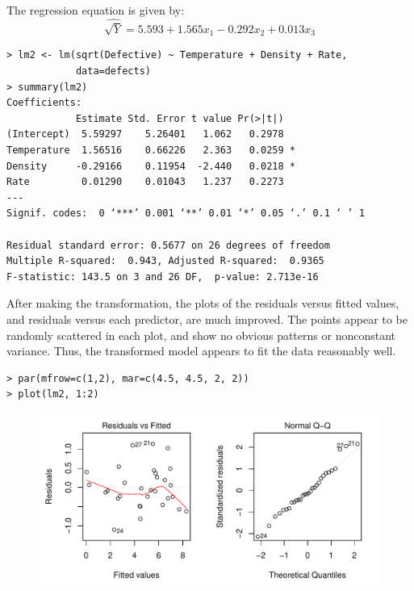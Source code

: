 \documentclass[10pt]{beamer}\usepackage[]{graphicx}\usepackage[]{color}
\begin{document}
\begin{frame}[fragile]
The regression equation is given by:
$$\widehat{\sqrt{Y}} = 5.593 + 1.565 x_1 - 0.292 x_2 + 0.013 x_3$$
\small
\begin{verbatim}
> lm2 <- lm(sqrt(Defective) ~ Temperature + Density + Rate, 
            data=defects)
> summary(lm2)
Coefficients:
            Estimate Std. Error t value Pr(>|t|)  
(Intercept)  5.59297    5.26401   1.062   0.2978  
Temperature  1.56516    0.66226   2.363   0.0259 *
Density     -0.29166    0.11954  -2.440   0.0218 *
Rate         0.01290    0.01043   1.237   0.2273  
---
Signif. codes:  0 ‘***’ 0.001 ‘**’ 0.01 ‘*’ 0.05 ‘.’ 0.1 ‘ ’ 1

Residual standard error: 0.5677 on 26 degrees of freedom
Multiple R-squared:  0.943,	Adjusted R-squared:  0.9365 
F-statistic: 143.5 on 3 and 26 DF,  p-value: 2.713e-16
\end{verbatim}

\end{frame}

\begin{frame}[fragile]
After making the transformation, the plots of the residuals versus fitted values, and residuals versus each predictor, are much improved.  The points appear to be randomly scattered in each plot, and show no obvious patterns or nonconstant variance.  Thus, the transformed model appears to fit the data reasonably well.  
\small
\begin{verbatim}
> par(mfrow=c(1,2), mar=c(4.5, 4.5, 2, 2))
> plot(lm2, 1:2)
\end{verbatim}
\begin{figure}
\includegraphics[scale=0.5]{figure/defects_resid2.pdf}
\end{figure}
\end{frame}
\end{document}
